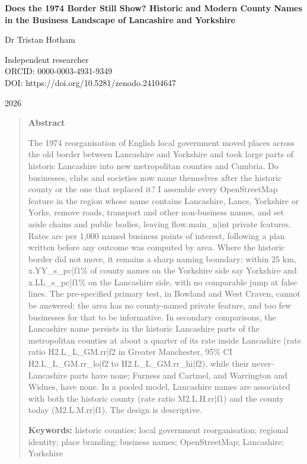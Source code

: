 \documentclass[11pt,a4paper]{article}
\begin{document}
\begin{center}
{\Large\bfseries Does the 1974 Border Still Show? Historic and Modern County Names in the Business Landscape of Lancashire and Yorkshire\par}
\vspace{1.2em}
{\large Dr Tristan Hotham\par}
\vspace{0.3em}
{\small Independent researcher\\
ORCID: 0000-0003-4931-9349\\
DOI: https://doi.org/10.5281/zenodo.24104647\par}
\vspace{0.8em}
2026
\end{center}

\begin{quote}
\small
\begin{center}\textbf{Abstract}\end{center}
The 1974 reorganisation of English local government moved places across the old border between Lancashire and Yorkshire and took large parts of historic Lancashire into new metropolitan counties and Cumbria. Do businesses, clubs and societies now name themselves after the historic county or the one that replaced it? I assemble every OpenStreetMap feature in the region whose name contains Lancashire, Lancs, Yorkshire or Yorks, remove roads, transport and other non-business names, and set aside chains and public bodies, leaving {{flow.main_n|int}} private features. Rates are per 1,000 named business points of interest, following a plan written before any outcome was computed by area. Where the historic border did not move, it remains a sharp naming boundary: within 25 km, {{x.YY_s_pc|f1}}\% of county names on the Yorkshire side say Yorkshire and {{x.LL_s_pc|f1}}\% on the Lancashire side, with no comparable jump at false lines. The pre-specified primary test, in Bowland and West Craven, cannot be answered: the area has no county-named private feature, and too few businesses for that to be informative. In secondary comparisons, the Lancashire name persists in the historic Lancashire parts of the metropolitan counties at about a quarter of its rate inside Lancashire (rate ratio {{H2.L_L_GM.rr|f2}} in Greater Manchester, 95\% CI {{H2.L_L_GM.rr_lo|f2}} to {{H2.L_L_GM.rr_hi|f2}}), while their never-Lancashire parts have none; Furness and Cartmel, and Warrington and Widnes, have none. In a pooled model, Lancashire names are associated with both the historic county (rate ratio {{M2.L.H.rr|f1}}) and the county today ({{M2.L.M.rr|f1}}). The design is descriptive.

\textbf{Keywords:} historic counties; local government reorganisation; regional identity; place branding; business names; OpenStreetMap; Lancashire; Yorkshire
\end{quote}
\end{document}
